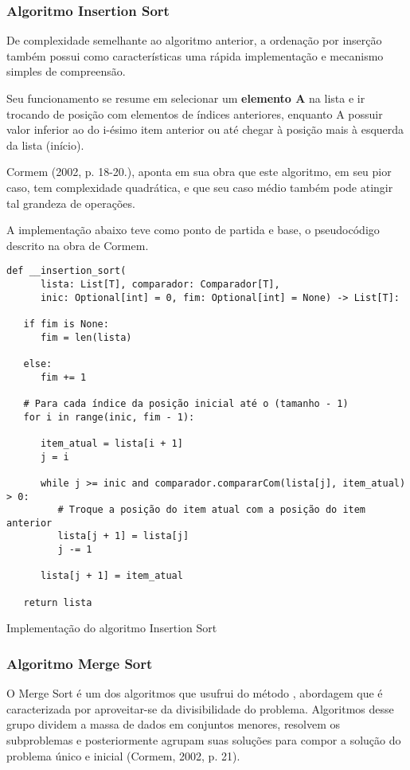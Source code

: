 \documentclass[a4paper,12pt]{scrartcl}
\begin{document}
\subsubsection{Algoritmo Insertion Sort}
De complexidade semelhante ao algoritmo anterior, a ordenação por inserção também possui como características uma rápida implementação e mecanismo simples de compreensão.

Seu funcionamento se resume em selecionar um \textbf{elemento A} na lista e ir trocando de posição com elementos de índices anteriores, enquanto A possuir valor inferior ao do i-ésimo item anterior ou até chegar à posição mais à esquerda da lista (início).

Cormem\cite{cormem} (2002, p. 18-20.), aponta em sua obra que este algoritmo, em seu pior caso, tem complexidade quadrática, e que seu caso médio também pode atingir tal grandeza de operações.

A implementação abaixo teve como ponto de partida e base, o pseudocódigo descrito na obra de Cormem.

\begin{listing}[H]
\begin{verbatim}
def __insertion_sort(
      lista: List[T], comparador: Comparador[T],
      inic: Optional[int] = 0, fim: Optional[int] = None) -> List[T]:

   if fim is None:
      fim = len(lista)

   else:
      fim += 1

   # Para cada índice da posição inicial até o (tamanho - 1)
   for i in range(inic, fim - 1):

      item_atual = lista[i + 1]
      j = i

      while j >= inic and comparador.compararCom(lista[j], item_atual) > 0:
         # Troque a posição do item atual com a posição do item anterior
         lista[j + 1] = lista[j]
         j -= 1

      lista[j + 1] = item_atual

   return lista
\end{verbatim}
\caption{\footnotesize{Implementação do algoritmo Insertion Sort}}
\end{listing}

\subsubsection{Algoritmo Merge Sort}
O Merge Sort é um dos algoritmos que usufrui do método , abordagem que é caracterizada por aproveitar-se da divisibilidade do problema. Algoritmos desse grupo dividem a massa de dados em conjuntos menores, resolvem os subproblemas e posteriormente agrupam suas soluções para compor a solução do problema único e inicial (Cormem\cite{cormem}, 2002, p. 21).
\end{document}
